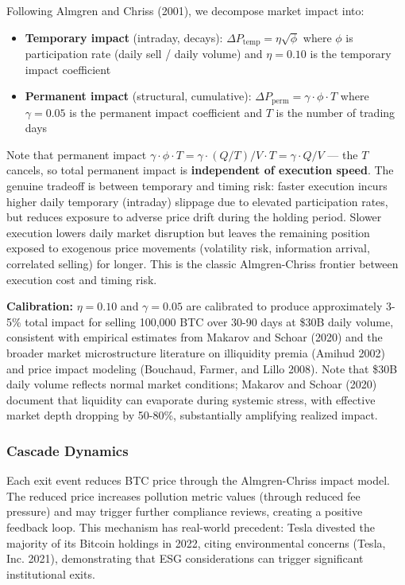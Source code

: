 \documentclass[
  11pt,
]{article}
\providecommand{\tightlist}{%
  \setlength{\itemsep}{0pt}\setlength{\parskip}{0pt}}\usepackage{longtable,booktabs,array}
\begin{document}
Following Almgren and Chriss (2001), we decompose market impact into:

\begin{itemize}
\tightlist
\item
  \textbf{Temporary impact} (intraday, decays):
  \(\Delta P_{\text{temp}} = \eta \sqrt{\phi}\) where \(\phi\) is
  participation rate (daily sell / daily volume) and \(\eta = 0.10\) is
  the temporary impact coefficient
\item
  \textbf{Permanent impact} (structural, cumulative):
  \(\Delta P_{\text{perm}} = \gamma \cdot \phi \cdot T\) where
  \(\gamma = 0.05\) is the permanent impact coefficient and \(T\) is the
  number of trading days
\end{itemize}

Note that permanent impact
\(\gamma \cdot \phi \cdot T = \gamma \cdot (Q/T) / V \cdot T = \gamma \cdot Q / V\)
--- the \(T\) cancels, so total permanent impact is \textbf{independent
of execution speed}. The genuine tradeoff is between temporary and
timing risk: faster execution incurs higher daily temporary (intraday)
slippage due to elevated participation rates, but reduces exposure to
adverse price drift during the holding period. Slower execution lowers
daily market disruption but leaves the remaining position exposed to
exogenous price movements (volatility risk, information arrival,
correlated selling) for longer. This is the classic Almgren-Chriss
frontier between execution cost and timing risk.

\textbf{Calibration:} \(\eta = 0.10\) and \(\gamma = 0.05\) are
calibrated to produce approximately 3-5\% total impact for selling
100,000 BTC over 30-90 days at \$30B daily volume, consistent with
empirical estimates from Makarov and Schoar (2020) and the broader
market microstructure literature on illiquidity premia (Amihud 2002) and
price impact modeling (Bouchaud, Farmer, and Lillo 2008). Note that
\$30B daily volume reflects normal market conditions; Makarov and Schoar
(2020) document that liquidity can evaporate during systemic stress,
with effective market depth dropping by 50-80\%, substantially
amplifying realized impact.

\hypertarget{cascade-dynamics}{%
\subsubsection{Cascade Dynamics}\label{cascade-dynamics}}

Each exit event reduces BTC price through the Almgren-Chriss impact
model. The reduced price increases pollution metric values (through
reduced fee pressure) and may trigger further compliance reviews,
creating a positive feedback loop. This mechanism has real-world
precedent: Tesla divested the majority of its Bitcoin holdings in 2022,
citing environmental concerns (Tesla, Inc. 2021), demonstrating that ESG
considerations can trigger significant institutional exits.
\end{document}
